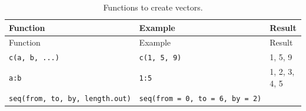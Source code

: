\documentclass[]{book}
\theoremstyle{definition}
\theoremstyle{definition}
\theoremstyle{remark}
\begin{document}
\begin{longtable}[]{@{}lll@{}}
\caption{Functions to create vectors.}\tabularnewline
\toprule
\begin{minipage}[b]{0.34\columnwidth}\raggedright\strut
Function\strut
\end{minipage} & \begin{minipage}[b]{0.39\columnwidth}\raggedright\strut
Example\strut
\end{minipage} & \begin{minipage}[b]{0.15\columnwidth}\raggedright\strut
Result\strut
\end{minipage}\tabularnewline
\midrule
\endfirsthead
\toprule
\begin{minipage}[b]{0.34\columnwidth}\raggedright\strut
Function\strut
\end{minipage} & \begin{minipage}[b]{0.39\columnwidth}\raggedright\strut
Example\strut
\end{minipage} & \begin{minipage}[b]{0.15\columnwidth}\raggedright\strut
Result\strut
\end{minipage}\tabularnewline
\midrule
\endhead
\begin{minipage}[t]{0.34\columnwidth}\raggedright\strut
\texttt{c(a,\ b,\ ...)}\strut
\end{minipage} & \begin{minipage}[t]{0.39\columnwidth}\raggedright\strut
\texttt{c(1,\ 5,\ 9)}\strut
\end{minipage} & \begin{minipage}[t]{0.15\columnwidth}\raggedright\strut
1, 5, 9\strut
\end{minipage}\tabularnewline
\begin{minipage}[t]{0.34\columnwidth}\raggedright\strut
\texttt{a:b}\strut
\end{minipage} & \begin{minipage}[t]{0.39\columnwidth}\raggedright\strut
\texttt{1:5}\strut
\end{minipage} & \begin{minipage}[t]{0.15\columnwidth}\raggedright\strut
1, 2, 3, 4, 5\strut
\end{minipage}\tabularnewline
\begin{minipage}[t]{0.34\columnwidth}\raggedright\strut
\texttt{seq(from,\ to,\ by,\ length.out)}\strut
\end{minipage} & \begin{minipage}[t]{0.39\columnwidth}\raggedright\strut
\texttt{seq(from\ =\ 0,\ to\ =\ 6,\ by\ =\ 2)}\strut

\end{minipage}
\end{longtable}
\end{document}

